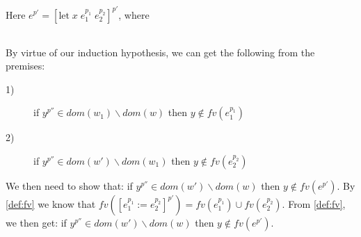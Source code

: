 \item[\runa{Ref-write}] Here $e^{p'}=[\mbox{let}\;x\;e_1^{p_1}\;e_2^{p_2}]^{p'}$, where
\begin{figure}[H]
	\setlength\tabcolsep{8pt}
	\begin{tabular}{l}
		
	\end{tabular}
\end{figure}
By virtue of our induction hypothesis, we can get the following from the premises:
\begin{description}
	\item[1)] if $y^{p''}\in dom(w_1)\backslash dom(w)$ then $y\notin fv(e_1^{p_1})$
	\item[2)] if $y^{p''}\in dom(w')\backslash dom(w_1)$ then $y\notin fv(e_2^{p_2})$
\end{description}
We then need to show that: if $y^{p''}\in dom(w')\backslash dom(w)$ then $y\notin fv(e^{p'})$.
By \cref{def:fv} we know that $fv([e_1^{p_1}:=e_2^{p_2}]^{p'})=fv(e_1^{p_1})\cup fv(e_2^{p_2})$.
From \cref{def:fv}, we then get: if $y^{p''}\in dom(w')\backslash dom(w)$ then $y\notin fv(e^{p'})$.
